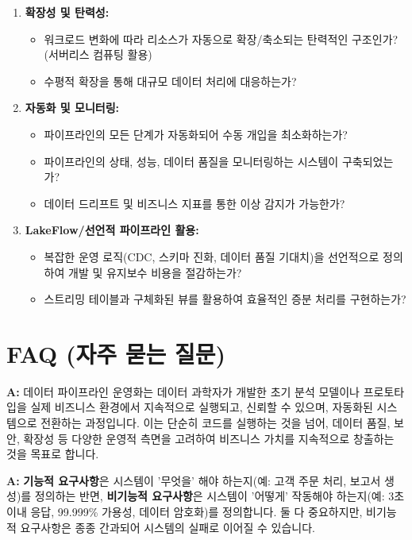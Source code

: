 \documentclass[11pt,a4paper]{article}
\theoremstyle{definition}
\newcommand{\newsection}[1]{\newpage\section{#1}}
\begin{document}
\begin{enumerate}
\begin{enumerate}
\begin{itemize}
        \item 데이터 계보(Lineage) 추적이 가능한가?
        \item 데이터 카탈로그를 통해 데이터 발견 가능성이 확보되었는가?
    \end{itemize}
    \item \textbf{확장성 및 탄력성:}
    \begin{itemize}
        \item 워크로드 변화에 따라 리소스가 자동으로 확장/축소되는 탄력적인 구조인가? (서버리스 컴퓨팅 활용)
        \item 수평적 확장을 통해 대규모 데이터 처리에 대응하는가?
    \end{itemize}
    \item \textbf{자동화 및 모니터링:}
    \begin{itemize}
        \item 파이프라인의 모든 단계가 자동화되어 수동 개입을 최소화하는가?
        \item 파이프라인의 상태, 성능, 데이터 품질을 모니터링하는 시스템이 구축되었는가?
        \item 데이터 드리프트 및 비즈니스 지표를 통한 이상 감지가 가능한가?
    \end{itemize}
    \item \textbf{LakeFlow/선언적 파이프라인 활용:}
    \begin{itemize}
        \item 복잡한 운영 로직(CDC, 스키마 진화, 데이터 품질 기대치)을 선언적으로 정의하여 개발 및 유지보수 비용을 절감하는가?
        \item 스트리밍 테이블과 구체화된 뷰를 활용하여 효율적인 증분 처리를 구현하는가?
    \end{itemize}
\end{enumerate}

\newsection{FAQ (자주 묻는 질문)}

\begin{tcolorbox}[conceptbox, title={Q: 데이터 파이프라인 운영화가 정확히 무엇인가요?}]
\textbf{A:} 데이터 파이프라인 운영화는 데이터 과학자가 개발한 초기 분석 모델이나 프로토타입을 실제 비즈니스 환경에서 지속적으로 실행되고, 신뢰할 수 있으며, 자동화된 시스템으로 전환하는 과정입니다. 이는 단순히 코드를 실행하는 것을 넘어, 데이터 품질, 보안, 확장성 등 다양한 운영적 측면을 고려하여 비즈니스 가치를 지속적으로 창출하는 것을 목표로 합니다.
\end{tcolorbox}

\begin{tcolorbox}[conceptbox, title={Q: 기능적 요구사항과 비기능적 요구사항의 차이점은 무엇인가요?}]
\textbf{A:} \textbf{기능적 요구사항}은 시스템이 '무엇을' 해야 하는지(예: 고객 주문 처리, 보고서 생성)를 정의하는 반면, \textbf{비기능적 요구사항}은 시스템이 '어떻게' 작동해야 하는지(예: 3초 이내 응답, 99.999\% 가용성, 데이터 암호화)를 정의합니다. 둘 다 중요하지만, 비기능적 요구사항은 종종 간과되어 시스템의 실패로 이어질 수 있습니다.
\end{tcolorbox}


\end{enumerate}
\end{document}
